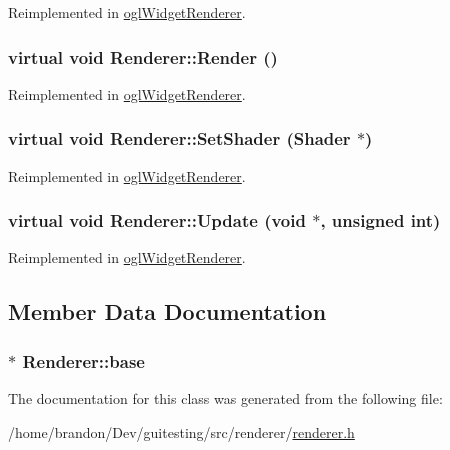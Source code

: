 Reimplemented in \hyperlink{classogl_widget_renderer_8438aacf8a1c70dcf1eb5879742d20e8}{oglWidgetRenderer}.\hypertarget{class_renderer_ae3d98a69fb55e9042306ba1621cd8d5}{
\subsubsection[{Render}]{\setlength{\rightskip}{0pt plus 5cm}virtual void Renderer::Render ()}}
\label{class_renderer_ae3d98a69fb55e9042306ba1621cd8d5}




Reimplemented in \hyperlink{classogl_widget_renderer_fb83427aa814bf2a18f3abded3161bc5}{oglWidgetRenderer}.\hypertarget{class_renderer_d2e8b81f3a9eabfb39f9f046d0f3d3ca}{
\subsubsection[{SetShader}]{\setlength{\rightskip}{0pt plus 5cm}virtual void Renderer::SetShader ({\bf Shader} $\ast$)}}
\label{class_renderer_d2e8b81f3a9eabfb39f9f046d0f3d3ca}




Reimplemented in \hyperlink{classogl_widget_renderer_5a63ddb69bee3f4a01510a27a9c2237b}{oglWidgetRenderer}.\hypertarget{class_renderer_d2d2554ed238ba29baa9ffd6b3530ba4}{
\subsubsection[{Update}]{\setlength{\rightskip}{0pt plus 5cm}virtual void Renderer::Update (void $\ast$, \/  unsigned int)}}
\label{class_renderer_d2d2554ed238ba29baa9ffd6b3530ba4}




Reimplemented in \hyperlink{classogl_widget_renderer_709ada8aa5e357dd916d48f74adbca07}{oglWidgetRenderer}.

\subsection{Member Data Documentation}
\hypertarget{class_renderer_de197ee897106c7e38ef027d0b211f5a}{
\subsubsection[{base}]{$\ast$ {\bf Renderer::base}}}
\label{class_renderer_de197ee897106c7e38ef027d0b211f5a}




The documentation for this class was generated from the following file:\begin{CompactItemize}
\item 
/home/brandon/Dev/guitesting/src/renderer/\hyperlink{renderer_8h}{renderer.h}\end{CompactItemize}

